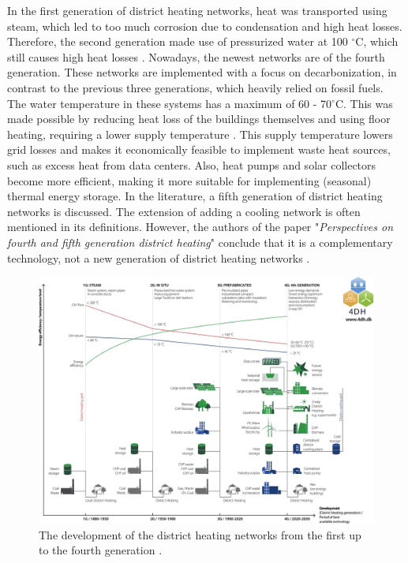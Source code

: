 In the first generation of district heating networks, heat was transported using steam, which led to too much corrosion due to condensation and high heat losses. Therefore, the second generation made use of pressurized water at 100 $^{\circ}\text{C}$, which still causes high heat losses \cite{FemkeJanssenLit}. Nowadays, the newest networks are of the fourth generation. These networks are implemented with a focus on decarbonization, in contrast to the previous three generations, which heavily relied on fossil fuels. The water temperature in these systems has a maximum of 60 - 70$^{\circ}\text{C}$. This was made possible by reducing heat loss of the buildings themselves and using floor heating, requiring a lower supply temperature \cite{FemkeJanssenLit}. This supply temperature lowers grid losses and makes it economically feasible to implement waste heat sources, such as excess heat from data centers. Also, heat pumps and solar collectors become more efficient, making it more suitable for implementing (seasonal) thermal energy storage. In the literature, a fifth generation of district heating networks is discussed. The extension of adding a cooling network is often mentioned in its definitions. However, the authors of the paper "\textit{Perspectives on fourth and fifth generation district heating}" conclude that it is a complementary technology, not a new generation of district heating networks \cite{4GDH5GDH}. 

\begin{figure}[h]
    \centering
    \includegraphics[width=0.5\linewidth]{figuresLIT/GDH.jpg}
    \caption{The development of the district heating networks from the first up to the fourth generation \cite{4GDH5GDH}.}
    \label{fig:devDHN}
\end{figure}

